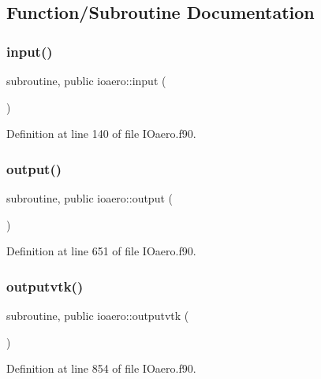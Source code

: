 \subsection{Function/\+Subroutine Documentation}
\mbox{\label{namespaceioaero_a039bc1aae10012ce8e368bc202bb81be}} 
\subsubsection{\texorpdfstring{input()}{input()}}
{\footnotesize\ttfamily subroutine, public ioaero\+::input (\begin{DoxyParamCaption}{ }\end{DoxyParamCaption})}



Definition at line 140 of file I\+Oaero.\+f90.

\mbox{\label{namespaceioaero_a1f2f8f2b4f6e233d2753c1fd1809a44a}} 
\subsubsection{\texorpdfstring{output()}{output()}}
{\footnotesize\ttfamily subroutine, public ioaero\+::output (\begin{DoxyParamCaption}{ }\end{DoxyParamCaption})}



Definition at line 651 of file I\+Oaero.\+f90.

\mbox{\label{namespaceioaero_a7eb68cb1588d24e05c8f056ca107e163}} 
\subsubsection{\texorpdfstring{outputvtk()}{outputvtk()}}
{\footnotesize\ttfamily subroutine, public ioaero\+::outputvtk (\begin{DoxyParamCaption}{ }\end{DoxyParamCaption})}



Definition at line 854 of file I\+Oaero.\+f90.



